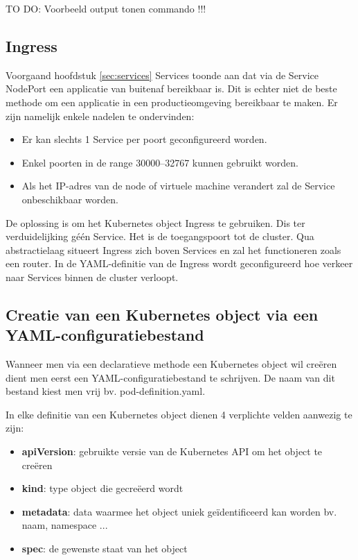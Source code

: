 TO DO: Voorbeeld output tonen commando !!!

\subsection{Ingress}

Voorgaand hoofdstuk \ref{sec:services} Services toonde aan dat via de Service NodePort een applicatie van buitenaf bereikbaar is. Dit is echter niet de beste methode om een applicatie in een productieomgeving bereikbaar te maken. \autocite{Dinesh2018} Er zijn namelijk enkele nadelen te ondervinden: 
\begin{itemize}
    \item Er kan slechts 1 Service per poort geconfigureerd worden.
    \item Enkel poorten in de range 30000–32767 kunnen gebruikt worden.
    \item Als het IP-adres van de node of virtuele machine verandert zal de Service onbeschikbaar worden.
\end{itemize} 

De oplossing is om het Kubernetes object Ingress te gebruiken. Dis ter verduidelijking géén Service. Het is de toegangspoort tot de cluster. Qua abstractielaag situeert Ingress zich boven Services en zal het functioneren zoals een router. 
In de YAML-definitie van de Ingress wordt geconfigureerd hoe verkeer naar Services binnen de cluster verloopt. 

\subsection{Creatie van een Kubernetes object via een YAML-configuratiebestand}

Wanneer men via een declaratieve methode een Kubernetes object wil creëren dient men eerst een YAML-configuratiebestand te schrijven. De naam van dit bestand kiest men vrij bv. pod-definition.yaml.

In elke definitie van een Kubernetes object dienen 4 verplichte velden aanwezig te zijn:
\begin{itemize}
    \item {\bf apiVersion}: gebruikte versie van de Kubernetes API om het object te creëren
    \item {\bf kind}: type object die gecreëerd wordt
    \item {\bf metadata}: data waarmee het object uniek geïdentificeerd kan worden bv. naam, namespace ...
    \item {\bf spec}: de gewenste staat van het object
\end{itemize}


